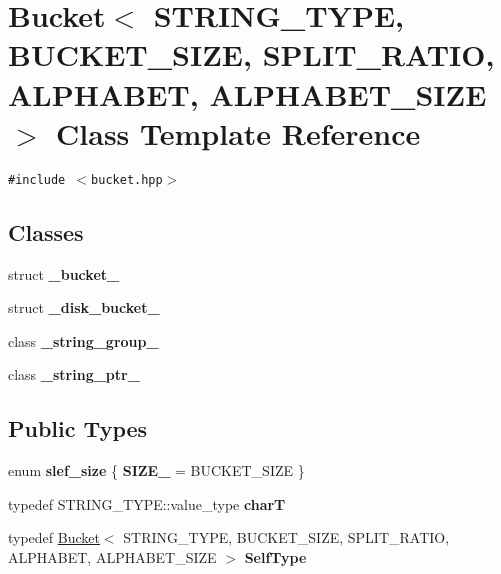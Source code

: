 \hypertarget{classBucket}{
\section{Bucket$<$ STRING\_\-TYPE, BUCKET\_\-SIZE, SPLIT\_\-RATIO, ALPHABET, ALPHABET\_\-SIZE $>$ Class Template Reference}
\label{classBucket}
}
{\tt \#include $<$bucket.hpp$>$}

\subsection*{Classes}
\begin{CompactItemize}
\item 
struct \textbf{\_\-bucket\_\-}
\item 
struct \textbf{\_\-disk\_\-bucket\_\-}
\item 
class \textbf{\_\-string\_\-group\_\-}
\item 
class \textbf{\_\-string\_\-ptr\_\-}
\end{CompactItemize}
\subsection*{Public Types}
\begin{CompactItemize}
\item 
enum \textbf{slef\_\-size} \{ \textbf{SIZE\_\-} =  BUCKET\_\-SIZE
 \}
\item 
\hypertarget{classBucket_3d55621ce647db3d64890858253d4ef1}{
typedef STRING\_\-TYPE::value\_\-type \textbf{charT}}
\label{classBucket_3d55621ce647db3d64890858253d4ef1}

\item 
\hypertarget{classBucket_36fc8a8c2e05b3d6aab22990c62fec55}{
typedef \hyperlink{classBucket}{Bucket}$<$ STRING\_\-TYPE, BUCKET\_\-SIZE, SPLIT\_\-RATIO, ALPHABET, ALPHABET\_\-SIZE $>$ \textbf{SelfType}}
\label{classBucket_36fc8a8c2e05b3d6aab22990c62fec55}

\end{CompactItemize}
